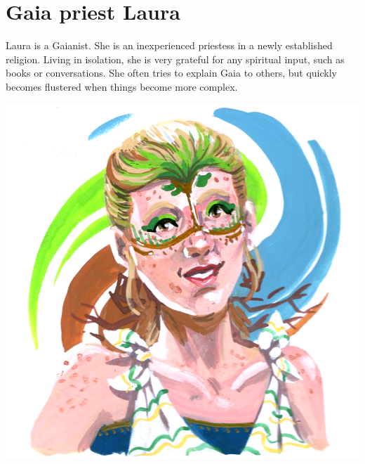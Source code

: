 \newpage

\section{Gaia priest Laura}

Laura is a Gaianist. She is an inexperienced priestess in a newly established religion. Living in isolation, she is very grateful for any spiritual input, such as books or conversations. She often tries to explain Gaia to others, but quickly becomes flustered when things become more complex.

\begin{center}
    \includegraphics[scale=0.4]{portraits/Flohmarkt_Laura.png}
\end{center}

